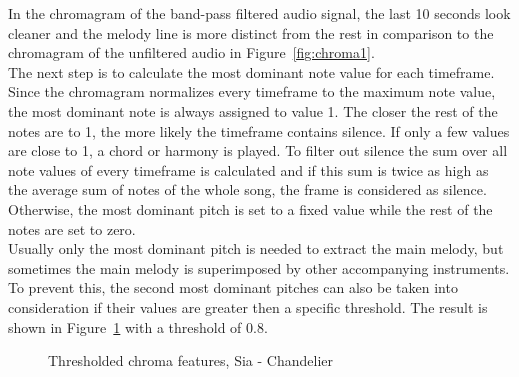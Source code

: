 \noindent In the chromagram of the band-pass filtered audio signal, the last 10 seconds look cleaner and the melody line is more distinct from the rest in comparison to the chromagram of the unfiltered audio in Figure~\ref{fig:chroma1}.\\
The next step is to calculate the most dominant note value for each timeframe. Since the chromagram normalizes every timeframe to the maximum note value, the most dominant note is always assigned to value 1. The closer the rest of the notes are to 1, the more likely the timeframe contains silence. If only a few values are close to 1, a chord or harmony is played. To filter out silence the sum over all note values of every timeframe is calculated and if this sum is twice as high as the average sum of notes of the whole song, the frame is considered as silence. Otherwise, the most dominant pitch is set to a fixed value while the rest of the notes are set to zero.\\
\noindent Usually only the most dominant pitch is needed to extract the main melody, but sometimes the main melody is superimposed by other accompanying instruments. To prevent this, the second most dominant pitches can also be taken into consideration if their values are greater then a specific threshold. The result is shown in Figure~\ref{fig:chromavg} with a threshold of 0.8.
\begin{figure}[htbp]
	\centering
	\caption{Thresholded chroma features, Sia - Chandelier}
	\label{fig:chromavg}
\end{figure}
\FloatBarrier

